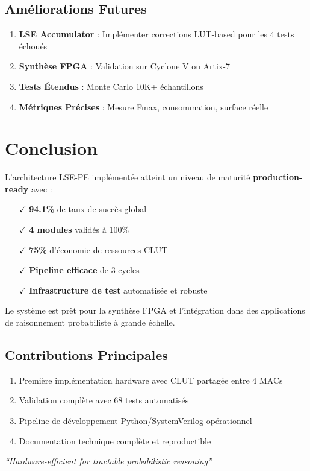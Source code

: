 \documentclass[12pt,a4paper]{article}
\begin{document}
\subsection{Améliorations Futures}

\begin{enumerate}
    \item \textbf{LSE Accumulator} : Implémenter corrections LUT-based pour les 4 tests échoués
    \item \textbf{Synthèse FPGA} : Validation sur Cyclone V ou Artix-7
    \item \textbf{Tests Étendus} : Monte Carlo 10K+ échantillons
    \item \textbf{Métriques Précises} : Mesure Fmax, consommation, surface réelle
\end{enumerate}

\section{Conclusion}

L'architecture LSE-PE implémentée atteint un niveau de maturité \textbf{production-ready} avec :

\begin{itemize}
    \item[$\checkmark$] \textbf{94.1\%} de taux de succès global
    \item[$\checkmark$] \textbf{4 modules} validés à 100\%
    \item[$\checkmark$] \textbf{75\%} d'économie de ressources CLUT
    \item[$\checkmark$] \textbf{Pipeline efficace} de 3 cycles
    \item[$\checkmark$] \textbf{Infrastructure de test} automatisée et robuste
\end{itemize}

Le système est prêt pour la synthèse FPGA et l'intégration dans des applications de raisonnement probabiliste à grande échelle.

\subsection{Contributions Principales}

\begin{enumerate}
    \item Première implémentation hardware avec CLUT partagée entre 4 MACs
    \item Validation complète avec 68 tests automatisés
    \item Pipeline de développement Python/SystemVerilog opérationnel
    \item Documentation technique complète et reproductible
\end{enumerate}

\vspace{1cm}

\begin{center}
\textit{``Hardware-efficient for tractable probabilistic reasoning''}
\end{center}
\end{document}
